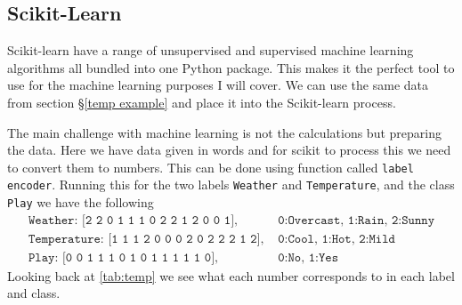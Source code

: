 \documentclass[12pt,twoside]{report}   %
\begin{document}
\subsection{Scikit-Learn}\label{Scikit-learn}
\vspace{-0.35in}
\underline{\hspace{6.2in}}
\vspace{-0.1in}

Scikit-learn have a range of unsupervised and supervised machine learning algorithms all bundled into one Python package. This makes it the perfect tool to use for the machine learning purposes I will cover. We can use the same data from section \S\ref{temp example} and place it into the Scikit-learn process.

The main challenge with machine learning is not the calculations but preparing the data. Here we have data given in words and for scikit to process this we need to convert them to numbers. This can be done using function called \colorbox{codegrey}{\texttt{label encoder}}. Running this for the two labels \colorbox{codegrey}{\texttt{Weather}} and \colorbox{codegrey}{\texttt{Temperature}}, and the class \colorbox{codegrey}{\texttt{Play}} we have the following
\begin{align*}
\texttt{Weather: [2 2 0 1 1 1 0 2 2 1 2 0 0 1],}&\texttt{ 0:Overcast, 1:Rain, 2:Sunny}\\
\texttt{Temperature: [1 1 1 2 0 0 0 2 0 2 2 2 1 2],}&\texttt{ 0:Cool, 1:Hot, 2:Mild}\\
\texttt{Play: [0 0 1 1 1 0 1 0 1 1 1 1 1 0],}&\texttt{ 0:No, 1:Yes}
\end{align*}
Looking back at \ref{tab:temp} we see what each number corresponds to in each label and class.
\end{document}
